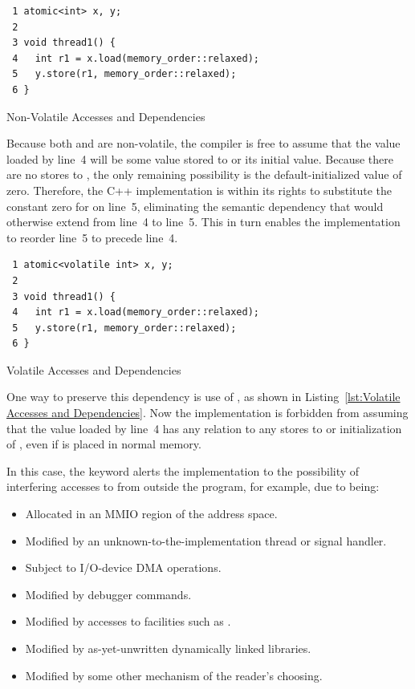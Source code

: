 \documentclass[10]{article}
\begin{document}
\begin{listing}
\begin{verbatim}
 1 atomic<int> x, y;
 2
 3 void thread1() {
 4   int r1 = x.load(memory_order::relaxed);
 5   y.store(r1, memory_order::relaxed);
 6 }
\end{verbatim}
\caption{Non-Volatile Accesses and Dependencies}
\label{lst:Non-Volatile Accesses and Dependencies}
\end{listing}

Because both  and  are non-volatile, the compiler is
free to assume that the value loaded by line~4 will be some value
stored to  or its initial value.
Because there are no stores to , the only remaining possibility
is the default-initialized value of zero.
Therefore, the C++ implementation is within its rights to substitute
the constant zero for  on line~5, eliminating the semantic
dependency that would otherwise extend from line~4 to line~5.
This in turn enables the implementation to reorder line~5 to
precede line~4.

\begin{listing}
\begin{verbatim}
 1 atomic<volatile int> x, y;
 2
 3 void thread1() {
 4   int r1 = x.load(memory_order::relaxed);
 5   y.store(r1, memory_order::relaxed);
 6 }
\end{verbatim}
\caption{Volatile Accesses and Dependencies}
\label{lst:Volatile Accesses and Dependencies}
\end{listing}

One way to preserve this dependency is use of , as shown in
Listing~\ref{lst:Volatile Accesses and Dependencies}.
Now the implementation is forbidden from assuming that the value loaded
by line~4 has any relation to any stores to or initialization of ,
even if  is placed in normal memory.

In this case, the  keyword alerts the implementation to
the possibility of interfering accesses to  from outside the
program, for example, due to  being:

\begin{itemize}
\item	Allocated in an MMIO region of the address space.
\item	Modified by an unknown-to-the-implementation thread
	or signal handler.
\item	Subject to I/O-device DMA operations.
\item	Modified by debugger commands.
\item	Modified by accesses to facilities such as .
\item	Modified by as-yet-unwritten dynamically linked libraries.
\item	Modified by some other mechanism of the reader's choosing.
\end{itemize}
\end{document}
